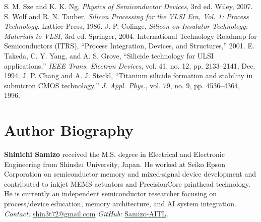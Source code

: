 \documentclass[conference]{IEEEtran}
\begin{document}
\begin{thebibliography}{99}
 S. M. Sze and K. K. Ng, \textit{Physics of Semiconductor Devices}, 3rd ed. Wiley, 2007.
 S. Wolf and R. N. Tauber, \textit{Silicon Processing for the VLSI Era, Vol. 1: Process Technology}. Lattice Press, 1986.
 J.-P. Colinge, \textit{Silicon-on-Insulator Technology: Materials to VLSI}, 3rd ed. Springer, 2004.
 International Technology Roadmap for Semiconductors (ITRS), ``Process Integration, Devices, and Structures,'' 2001.
 E. Takeda, C. Y. Yang, and A. S. Grove, ``Silicide technology for ULSI applications,'' \textit{IEEE Trans. Electron Devices}, vol. 41, no. 12, pp. 2133--2141, Dec. 1994.
 J. P. Chang and A. J. Steckl, ``Titanium silicide formation and stability in submicron CMOS technology,'' \textit{J. Appl. Phys.}, vol. 79, no. 9, pp. 4536--4364, 1996.
\end{thebibliography}

\section*{Author Biography}
\textbf{Shinichi Samizo} received the M.S. degree in Electrical and Electronic Engineering from Shinshu University, Japan. 
He worked at Seiko Epson Corporation on semiconductor memory and mixed-signal device development and contributed to inkjet MEMS actuators and PrecisionCore printhead technology. 
He is currently an independent semiconductor researcher focusing on process/device education, memory architecture, and AI system integration.\\
\emph{Contact:} \href{mailto:shin3t72@gmail.com}{shin3t72@gmail.com}\quad
\emph{GitHub:} \href{https://github.com/Samizo-AITL}{Samizo-AITL}.
\end{document}
